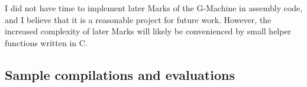 I did not have time to implement later Marks of the G-Machine in assembly code, and I believe that it is a reasonable project for future work. However, the increased complexity of later Marks will likely be convenienced by small helper functions written in C.

\subsection{Sample compilations and evaluations}
\label{sec:compiler-examples}


